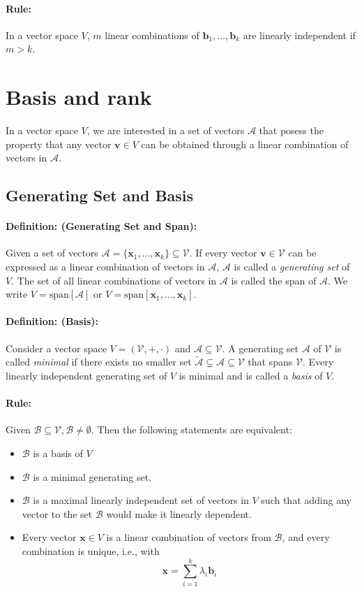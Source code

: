 \documentclass[12pt]{article}
\newcommand{\vecs}[2]{{\bm{#1}_1, \dots, \bm{#1}_#2}}
\newcommand{\xdefinition}[2]{\paragraph{\colorbox{#1!30}{\textbf{Definition:}} (#2):}}
\newcommand{\xrule}[1]{\paragraph{\colorbox{#1!30}{\textbf{Rule:}}}}
\newcommand{\mc}[1]{\mathcal{#1}}
\begin{document}
\xrule{green} In a vector space $V$, $m$ linear combinations of $\vecs{b}{k}$ are linearly independent if $m > k$. 

\section{Basis and rank}

In a vector space $V$, we are interested in a set of vectors $\mathcal{A}$ that posess the property that any vector $\bm{v} \in V$ can be obtained through a linear combination of vectors in $\mathcal{A}$.

\subsection{Generating Set and Basis}

\xdefinition{green}{Generating Set and Span} Given a set of vectors $\mc{A} = \{ \vecs{x}{k} \} \subseteq \mc{V}$. If every vector $\bm{v} \in \mc{V}$ can be expressed as a linear combination of vectors in $\mc{A}$, $\mc{A}$ is called a \textit{generating set} of $V$.	The set of all linear combinations of vectors in $\mc{A}$ is called the span of $\mc{A}$. We write $V = \text{span}[\mc{A}]$ or $V = \text{span}[\vecs{x}{k}]$.

\xdefinition{green}{Basis} Consider a vector space $V = (\mc{V}, +, \cdot)$ and $\mc{A} \subseteq \mc{V}$. A generating set $\mc{A}$ of $\mc{V}$ is called \textit{minimal} if there exists no smaller set $\tilde{\mc{A}} \subsetneq \mc{A} \subseteq \mc{V}$ that spans $\mc{V}$. Every linearly independent generating set of $V$ is minimal and is called a \textit{basis} of $V$.

\xrule{green} Given $\mc{B} \subseteq \mc{V}, \mc{B} \neq \emptyset$. Then the following statements are equivalent:
%
\begin{itemize}
	\item $\mc{B}$ is a basis of $V$
	\item $\mc{B}$ is a minimal generating set.
	\item $\mc{B}$ is a maximal linearly independent set of vectors in $V$ such that adding any vector to the set $\mc{B}$ would make it linearly dependent. 
	\item Every vector $\bm{x} \in V$ is a linear combination of vectors from $\mc{B}$, and every combination is unique, i.e., with
		\begin{equation}
			\bm{x} = \sum\limits_{i=1}^{k} \lambda_i \bm{b}_i
		\end{equation}
\end{itemize}
\end{document}
